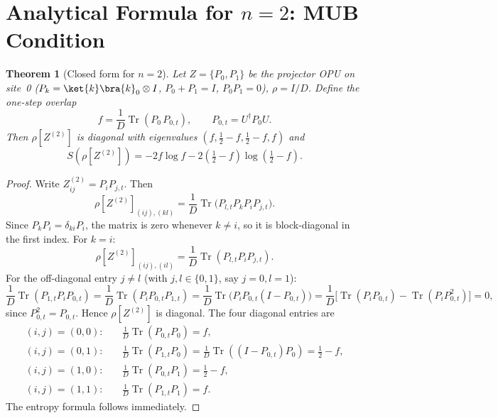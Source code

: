 \documentclass[12pt,a4paper]{article}
\newtheorem{theorem}{Theorem}[section]
\begin{document}
\section{Analytical Formula for \texorpdfstring{$n=2$}{n=2}: MUB Condition}
\label{sec:time_afl_n2}

\begin{theorem}[Closed form for $n=2$]
\label{thm:n2_formula}
Let $Z=\{P_0,P_1\}$ be the projector OPU on site~0
($P_k=\ket{k}\bra{k}_0\otimes I$, $P_0+P_1=I$, $P_0P_1=0$), $\rho=I/D$.
Define the \emph{one-step overlap}
\[
  f = \frac{1}{D}\operatorname{Tr}(P_0\,P_{0,t}),\qquad
  P_{0,t}=U^{\dagger}P_0 U.
\]
Then $\rho[Z^{(2)}]$ is diagonal with eigenvalues
$(f,\tfrac{1}{2}-f,\tfrac{1}{2}-f,f)$ and
\[
  S(\rho[Z^{(2)}])
  = -2f\log f - 2\!\left(\tfrac{1}{2}-f\right)\!\log\!\left(\tfrac{1}{2}-f\right).
\]
\end{theorem}
\begin{proof}
Write $Z^{(2)}_{ij}=P_i P_{j,t}$.  Then
\[
  \rho[Z^{(2)}]_{(ij),(kl)}
  = \frac{1}{D}\operatorname{Tr}\bigl(P_{l,t}P_k P_i P_{j,t}\bigr).
\]
Since $P_k P_i=\delta_{ki}P_i$, the matrix is zero whenever $k\ne i$, so it is
block-diagonal in the first index.  For $k=i$:
\[
  \rho[Z^{(2)}]_{(ij),(il)}
  = \frac{1}{D}\operatorname{Tr}(P_{l,t}P_i P_{j,t}).
\]
For the off-diagonal entry $j\ne l$ (with $j,l\in\{0,1\}$, say $j=0,l=1$):
\[
  \frac{1}{D}\operatorname{Tr}(P_{1,t}P_i P_{0,t})
  = \frac{1}{D}\operatorname{Tr}(P_i P_{0,t}P_{1,t})
  = \frac{1}{D}\operatorname{Tr}\bigl(P_i P_{0,t}(I-P_{0,t})\bigr)
  = \frac{1}{D}\bigl[\operatorname{Tr}(P_i P_{0,t})-\operatorname{Tr}(P_i P_{0,t}^2)\bigr]=0,
\]
since $P_{0,t}^2=P_{0,t}$.  Hence $\rho[Z^{(2)}]$ is diagonal.  The four
diagonal entries are
\begin{align*}
  (i,j)=(0,0):\quad &\tfrac{1}{D}\operatorname{Tr}(P_{0,t}P_0)=f,\\
  (i,j)=(0,1):\quad &\tfrac{1}{D}\operatorname{Tr}(P_{1,t}P_0)
    =\tfrac{1}{D}\operatorname{Tr}((I-P_{0,t})P_0)=\tfrac12-f,\\
  (i,j)=(1,0):\quad &\tfrac{1}{D}\operatorname{Tr}(P_{0,t}P_1)=\tfrac12-f,\\
  (i,j)=(1,1):\quad &\tfrac{1}{D}\operatorname{Tr}(P_{1,t}P_1)=f.
\end{align*}
The entropy formula follows immediately.
\end{proof}
\end{document}
